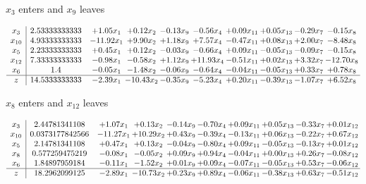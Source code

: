 \documentclass[9pt]{article}
\begin{document}
 $ x_{3} $ enters and $ x_{9} $ leaves 

 \[\begin{array}{c| c c@{\hskip 2pt} c@{\hskip 2pt} c@{\hskip 2pt} c@{\hskip 2pt} c@{\hskip 2pt} c@{\hskip 2pt} c@{\hskip 2pt} c@{\hskip 2pt} }
 x_{3}   &  2.53333333333 & +  1.05 x_{1} & +  0.12 x_{2} & -0.13 x_{9} & -0.56 x_{4} & +  0.09 x_{11} & +  0.05 x_{13} & -0.29 x_{7} & -0.15 x_{8}\\
 x_{10}   &  4.93333333333 & -11.92 x_{1} & +  9.90 x_{2} & +  1.18 x_{9} & +  7.57 x_{4} & -0.47 x_{11} & +  0.08 x_{13} & +  2.00 x_{7} & -8.48 x_{8}\\
 x_{5}   &  2.23333333333 & +  0.45 x_{1} & +  0.12 x_{2} & -0.03 x_{9} & -0.66 x_{4} & +  0.09 x_{11} & -0.05 x_{13} & -0.09 x_{7} & -0.15 x_{8}\\
 x_{12}   &  7.33333333333 & -0.98 x_{1} & -0.58 x_{2} & +  1.12 x_{9} & + 11.93 x_{4} & -0.51 x_{11} & +  0.02 x_{13} & +  3.32 x_{7} & -12.70 x_{8}\\
 x_{6}   &  1.4 & -0.05 x_{1} & -1.48 x_{2} & -0.06 x_{9} & -0.64 x_{4} & -0.04 x_{11} & -0.05 x_{13} & +  0.33 x_{7} & +  0.78 x_{8}\\
\hline
z    &  14.5333333333 & -2.39 x_{1} & -10.43 x_{2} & -0.35 x_{9} & -5.23 x_{4} & +  0.20 x_{11} & -0.39 x_{13} & -1.07 x_{7} & +  6.52 x_{8}\\
\end{array}\]


 $ x_{8} $ enters and $ x_{12} $ leaves 

 \[\begin{array}{c| c c@{\hskip 2pt} c@{\hskip 2pt} c@{\hskip 2pt} c@{\hskip 2pt} c@{\hskip 2pt} c@{\hskip 2pt} c@{\hskip 2pt} c@{\hskip 2pt} }
 x_{3}   &  2.44781341108 & +  1.07 x_{1} & +  0.13 x_{2} & -0.14 x_{9} & -0.70 x_{4} & +  0.09 x_{11} & +  0.05 x_{13} & -0.33 x_{7} & +  0.01 x_{12}\\
 x_{10}   &  0.0373177842566 & -11.27 x_{1} & + 10.29 x_{2} & +  0.43 x_{9} & -0.39 x_{4} & -0.13 x_{11} & +  0.06 x_{13} & -0.22 x_{7} & +  0.67 x_{12}\\
 x_{5}   &  2.14781341108 & +  0.47 x_{1} & +  0.13 x_{2} & -0.04 x_{9} & -0.80 x_{4} & +  0.09 x_{11} & -0.05 x_{13} & -0.13 x_{7} & +  0.01 x_{12}\\
 x_{8}   &  0.577259475219 & -0.08 x_{1} & -0.05 x_{2} & +  0.09 x_{9} & +  0.94 x_{4} & -0.04 x_{11} & +  0.00 x_{13} & +  0.26 x_{7} & -0.08 x_{12}\\
 x_{6}   &  1.84897959184 & -0.11 x_{1} & -1.52 x_{2} & +  0.01 x_{9} & +  0.09 x_{4} & -0.07 x_{11} & -0.05 x_{13} & +  0.53 x_{7} & -0.06 x_{12}\\
\hline
z    &  18.2962099125 & -2.89 x_{1} & -10.73 x_{2} & +  0.23 x_{9} & +  0.89 x_{4} & -0.06 x_{11} & -0.38 x_{13} & +  0.63 x_{7} & -0.51 x_{12}\\
\end{array}\]
\end{document}
